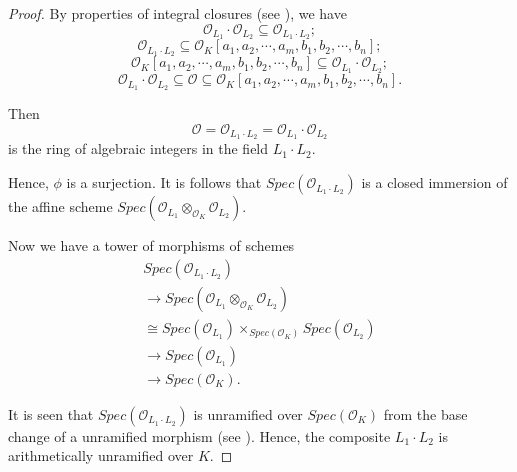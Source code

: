 \documentclass{amsart}
\theoremstyle{definition}
\numberwithin{equation}{section}
\begin{document}
\begin{proof}
By properties of integral closures (see \cite{bourbaki}), we have
\begin{equation*}
\mathcal{O}_{L_{1}}\cdot \mathcal{O}_{L_{2}}\subseteq\mathcal{O}_{L_{1}\cdot
L_{2}};
\end{equation*}
\begin{equation*}
\mathcal{O}_{L_{1}\cdot L_{2}}\subseteq\mathcal{O}_{K}[a_{1},a_{2},\cdots,
a_{m},b_{1},b_{2},\cdots, b_{n}];
\end{equation*}
\begin{equation*}
\mathcal{O}_{K}[a_{1},a_{2},\cdots, a_{m},b_{1},b_{2},\cdots,
b_{n}]\subseteq \mathcal{O}_{L_{1}}\cdot \mathcal{O}_{L_{2}};
\end{equation*}
\begin{equation*}
\mathcal{O}_{L_{1}}\cdot \mathcal{O}_{L_{2}}\subseteq\mathcal{O}\subseteq
\mathcal{O}_{K}[a_{1},a_{2},\cdots, a_{m},b_{1},b_{2},\cdots, b_{n}].
\end{equation*}

Then
\begin{equation*}
\mathcal{O}=\mathcal{O}_{L_{1}\cdot L_{2}}=\mathcal{O}_{L_{1}} \cdot
\mathcal{O}_{L_{2}}
\end{equation*}
is the ring of algebraic integers in the field $L_{1}\cdot L_{2}$.

Hence, $\phi$ is a surjection. It is follows that $Spec(\mathcal{O}_{L_{1}\cdot L_{2}})$ is a closed immersion of the affine scheme $Spec(\mathcal{O}_{L_{1}}\otimes _{\mathcal{O}_{K}} \mathcal{O}_{L_{2}})$.

Now we have a tower of morphisms of schemes
\begin{equation*}
\begin{array}{l}
Spec(\mathcal{O}_{L_{1}\cdot L_{2}}) \\
\to Spec(\mathcal{O}_{L_{1}}\otimes _{\mathcal{O}_{K}} \mathcal{O} _{L_{2}})
\\
\cong Spec(\mathcal{O}_{L_{1}})\times _{Spec(\mathcal{O} _{K})} Spec(\mathcal{O}_{L_{2}}) \\
\to Spec(\mathcal{O}_{L_{1}}) \\
\to Spec(\mathcal{O}_{K}).\end{array}\end{equation*}

It is seen that $Spec(\mathcal{O}_{L_{1}\cdot L_{2}})$ is unramified over $
Spec(\mathcal{O} _{K}) $ from the base change of a unramified morphism (see
\cite{sga1}). Hence, the composite $L_{1}\cdot L_{2}$ is arithmetically
unramified over $K$.
\end{proof}
\end{document}
